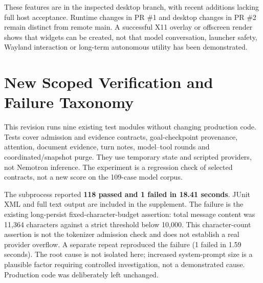 \documentclass[11pt,a4paper]{article}
\begin{document}
These features are in the inspected desktop branch, with recent additions lacking full host acceptance. Runtime changes in PR \#1 and desktop changes in PR \#2 remain distinct from remote main. A successful X11 overlay or offscreen render shows that widgets can be created, not that model conversation, launcher safety, Wayland interaction or long-term autonomous utility has been demonstrated.


\section{New Scoped Verification and Failure Taxonomy}\label{sec:newchecks}
This revision runs nine existing test modules without changing production code. Tests cover admission and evidence contracts, goal-checkpoint provenance, attention, document evidence, turn notes, model--tool rounds and coordinated/snapshot purge. They use temporary state and scripted providers, not Nemotron inference. The experiment is a regression check of selected contracts, not a new score on the 109-case model corpus.

The subprocess reported \textbf{118 passed and 1 failed in 18.41 seconds}. JUnit XML and full text output are included in the supplement. The failure is the existing long-persist fixed-character-budget assertion: total message content was 11,364 characters against a strict threshold below 10,000. This character-count assertion is not the tokenizer admission check and does not establish a real provider overflow. A separate repeat reproduced the failure (1 failed in 1.59 seconds). The root cause is not isolated here; increased system-prompt size is a plausible factor requiring controlled investigation, not a demonstrated cause. Production code was deliberately left unchanged.
\end{document}
